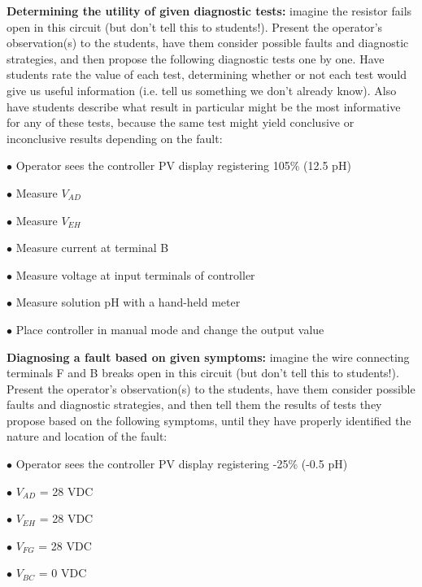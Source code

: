 \vskip 10pt


\noindent
{\bf Determining the utility of given diagnostic tests:} imagine the resistor fails open in this circuit (but don't tell this to students!).  Present the operator's observation(s) to the students, have them consider possible faults and diagnostic strategies, and then propose the following diagnostic tests one by one.  Have students rate the value of each test, determining whether or not each test would give us useful information (i.e. tell us something we don't already know).  Also have students describe what result in particular might be the most informative for any of these tests, because the same test might yield conclusive or inconclusive results depending on the fault:

\medskip
\item{$\bullet$} Operator sees the controller PV display registering 105\% (12.5 pH)
\item{$\bullet$} Measure $V_{AD}$
\item{$\bullet$} Measure $V_{EH}$
\item{$\bullet$} Measure current at terminal B
\item{$\bullet$} Measure voltage at input terminals of controller
\item{$\bullet$} Measure solution pH with a hand-held meter
\item{$\bullet$} Place controller in manual mode and change the output value
\medskip


\vskip 10pt


\noindent
{\bf Diagnosing a fault based on given symptoms:} imagine the wire connecting terminals F and B breaks open in this circuit (but don't tell this to students!).  Present the operator's observation(s) to the students, have them consider possible faults and diagnostic strategies, and then tell them the results of tests they propose based on the following symptoms, until they have properly identified the nature and location of the fault:

\medskip
\item{$\bullet$} Operator sees the controller PV display registering -25\% (-0.5 pH)
\item{$\bullet$} $V_{AD}$ = 28 VDC
\item{$\bullet$} $V_{EH}$ = 28 VDC
\item{$\bullet$} $V_{FG}$ = 28 VDC
\item{$\bullet$} $V_{BC}$ = 0 VDC
\medskip




